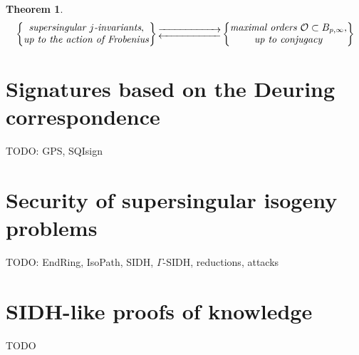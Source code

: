 \documentclass[10pt]{article}
\theoremstyle{plain}
\newtheorem{theorem}{Theorem}
\theoremstyle{definition}
\def\O{\ensuremath{\mathcal{O}}}
\begin{document}
\begin{prposition}
\begin{theorem}
    \begin{equation*}
        \left\{
            \begin{tabular}{@{} c @{}}
                \emph{supersingular $j$-invariants}, \\
                \emph{up to the action of Frobenius}
            \end{tabular}
        \right\}
        \begin{gathered}
            \overset{}{\xrightarrow{\hspace*{2cm}}} \\[-2ex]
            \underset{}{\xleftarrow{\hspace*{2cm}}}
        \end{gathered}
        \left\{
            \begin{tabular}{@{} c @{}}
                \emph{maximal orders $\O\subset B_{p,\infty}$}, \\
                \emph{up to conjugacy}
            \end{tabular}
        \right\}
    \end{equation*}
\end{theorem}


\section{Signatures based on the Deuring correspondence}
\label{sec:sqisign}

TODO: GPS, SQIsign


\section{Security of supersingular isogeny problems}
\label{sec:security}

TODO: EndRing, IsoPath, SIDH, $Γ$-SIDH, reductions, attacks

\section{SIDH-like proofs of knowledge}
\label{sec:sidh-poks}

TODO


\clearpage
{}





\end{prposition}
\end{document}
